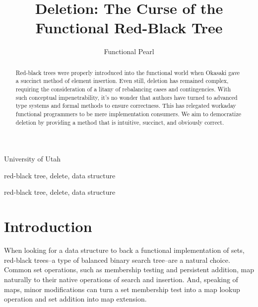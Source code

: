 \documentclass[preprint]{sigplanconf}
\begin{document}
\copyrightdata{[to be supplied]} 


\title{Deletion: The Curse of the Functional Red-Black Tree}
\subtitle{Functional Pearl}

           {University of Utah}

\maketitle

\begin{abstract}
Red-black trees were properly introduced into the functional world when Okasaki gave a succinct method of element insertion. Even still, deletion has remained complex, requiring the consideration of a litany of rebalancing cases and contingencies. With such conceptual impenetrability, it's no wonder that authors have turned to advanced type systems and formal methods to ensure correctness. This has relegated workaday functional programmers to be mere implementation consumers. We aim to democratize deletion by providing a method that is intuitive, succinct, and obviously correct.
\end{abstract}


\terms
red-black tree, delete, data structure

\keywords
red-black tree, delete, data structure

\section{Introduction}

When looking for a data structure to back a functional implementation of sets, red-black trees--a type of balanced binary search tree--are a natural choice. Common set operations, such as membership testing and persistent addition, map naturally to their native operations of search and insertion. And, speaking of maps, minor modifications can turn a set membership test into a map lookup operation and set addition into map extension.
\end{document}
